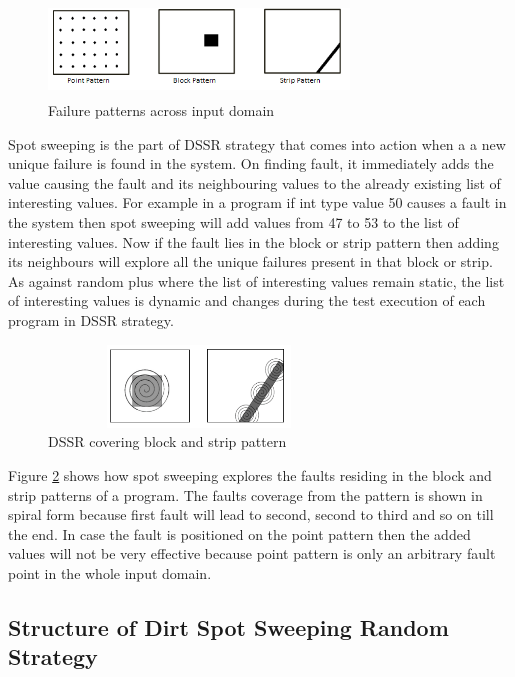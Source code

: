 \documentclass[conference]{IEEEtran}
\begin{document}
\begin{figure}[ht]                                    
\centering
\includegraphics[width= 8cm,height=2.5cm]{ART_Patterns.png}
\caption{Failure patterns across input domain \cite{Chen2008}}
\label{fig:patterns}
\end{figure}

Spot sweeping is the part of DSSR strategy that comes into action when a a new unique failure is found in the system. On finding fault, it immediately adds the value causing the fault and its neighbouring values to the already existing list of interesting values. For example in a program if int type value 50 causes a fault in the system then spot sweeping will add values from 47 to 53 to the list of interesting values. Now if the fault lies in the block or strip pattern then adding its neighbours will explore all the unique failures present in that block or strip. As against random plus where the list of interesting values remain static, the list of interesting values is dynamic and changes during the test execution of each program in DSSR strategy.

\begin{figure}[ht]
\centering
\includegraphics[width=8cm,height=2.2cm]{block2.png}
\caption{DSSR covering block and strip pattern}
\label{fig:block2}
\end{figure}

Figure \ref{fig:block2} shows how spot sweeping explores the faults residing in the block and strip patterns of a program. The faults coverage from the pattern is shown in spiral form because first fault will lead to second, second to third and so on till the end. In case the fault is positioned on the point pattern then the added values will not be very effective because point pattern is only an arbitrary fault point in the whole input domain.

\subsection{Structure of Dirt Spot Sweeping Random Strategy}
\end{document}
